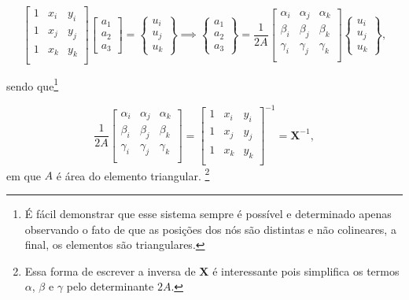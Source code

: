 \begin{equation}
    \begin{bmatrix}
        1 & x_i & y_i \\
        1 & x_j & y_j \\
        1 & x_k & y_k \\
    \end{bmatrix}
    \begin{bmatrix}
        a_1 \\ a_2 \\ a_3
    \end{bmatrix}
    = \begin{Bmatrix}
        u_i \\ u_j \\ u_k
    \end{Bmatrix} \implies
    \begin{Bmatrix}
        a_1 \\ a_2 \\ a_3
    \end{Bmatrix} =
    \frac{1}{2A}
    \begin{bmatrix}
        \alpha_i & \alpha_j & \alpha_k \\
        \beta_i & \beta_j & \beta_k \\
        \gamma_i & \gamma_j & \gamma_k \\
    \end{bmatrix}
    \begin{Bmatrix}
        u_i \\ u_j \\ u_k
    \end{Bmatrix},
    \label{eq:matriz_x}
\end{equation}

sendo que\footnote{É fácil demonstrar que esse sistema sempre é possível e determinado apenas observando o fato de que as posições dos nós são distintas e não colineares, a final, os elementos são triangulares.}

\begin{equation}
    \frac{1}{2A}
    \begin{bmatrix}
        \alpha_i & \alpha_j & \alpha_k \\
        \beta_i & \beta_j & \beta_k \\
        \gamma_i & \gamma_j & \gamma_k \\
    \end{bmatrix} = 
    \begin{bmatrix}
        1 & x_i & y_i \\
        1 & x_j & y_j \\
        1 & x_k & y_k \\
    \end{bmatrix}^{-1} = \bm{X}^{-1},
\end{equation}
em que $A$ é área do elemento triangular. \footnote{Essa forma de escrever a inversa de $\bm{X}$ é interessante pois simplifica os termos $\alpha$, $\beta$ e $\gamma$ pelo determinante $2A$.}

